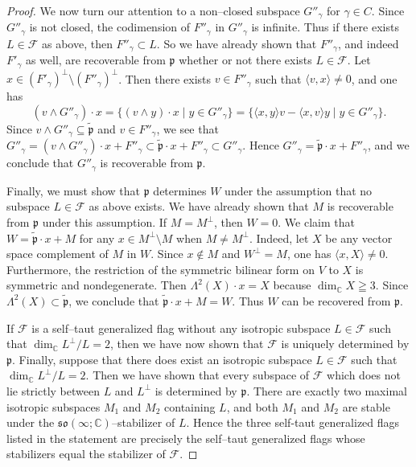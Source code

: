 \documentclass[oneside,leqno,11pt]{article}
\def\gp{\mathfrak{p}}
\def\gso{\mathfrak{so}}
\def\C{\mathbb{C}}
\def\cF{\mathcal{F}}
\begin{document}
\begin{proof}
We now turn our attention to a non--closed subspace $G''_\gamma$ for $\gamma \in C$.  Since $G''_\gamma$ is not closed, the codimension of $F''_\gamma$ in $G''_\gamma$ is infinite.  Thus if there exists $L \in \cF$ as above, then $F''_\gamma \subset L$.  So we have already shown that $F''_\gamma$,  and indeed $F'_\gamma$ as well, are recoverable from $\gp$ whether or not there exists $L \in \cF$.  Let $x \in (F'_\gamma)^\perp \setminus (F''_\gamma)^\perp$.
Then there exists 
$v \in F''_\gamma$ such that $\langle v ,x \rangle \neq 0$, and one has
$$
(v \wedge G''_\gamma) \cdot x  =  \{ (v \wedge y) \cdot x \mid y \in G''_\gamma \} 
 =  \{ \langle x , y \rangle v - \langle x , v \rangle y \mid y \in G''_\gamma \}.
$$
Since $v \wedge G''_\gamma \subseteq \widetilde{\gp} $ and $v \in F''_\gamma$, we see that 
$G''_\gamma = (v \wedge G''_\gamma) \cdot x + F''_\gamma \subset 
\widetilde{\gp}  \cdot x + F''_\gamma \subset G''_\gamma$.  Hence 
$G''_\gamma =  \widetilde{\gp}  \cdot x + F''_\gamma$, and we conclude that $G''_\gamma$ is recoverable from $\gp$.

Finally, we must show that $\gp$ determines $W$ under the assumption that no subspace $L \in \cF$ as above exists.  We have already shown that $M$ is recoverable from $\gp$ under this assumption.
If $M = M^\bot$, then $W = 0$.   We claim that $W = \widetilde{\gp} \cdot x + M$ for any $x \in M^\perp \setminus M$ when $M \neq M^\bot$.
Indeed, let $X$ be any vector space complement of $M$ in $W$. 
Since $x \notin M$ and $W^\perp = M$, one has $\langle x , X \rangle \neq 0$.  
Furthermore, the restriction of the symmetric bilinear form on $V$ to $X$ is symmetric and nondegenerate. 
Then $\Lambda^2 (X) \cdot x = X$ because $\dim_\C X \geqq 3$.
Since $\Lambda^2(X) \subset \widetilde{\gp}$, we conclude that $\widetilde{\gp}  \cdot x + M = W$.  
Thus $W$ can be recovered from $\gp$.

If $\cF$ is a self--taut generalized flag without any isotropic subspace $L \in \cF$ such that $\dim_\C L^\perp / L = 2$, then we have now shown that $\cF$ is uniquely determined by $\gp$.  Finally, suppose that there does exist an isotropic subspace $L \in \cF$ such that $\dim_\C L^\perp / L = 2$.  Then we have shown that every subspace of $\cF$ which does not lie strictly between $L$ and $L^\perp$ is determined by $\gp$.  There are exactly two maximal isotropic subspaces $M_1$ and $M_2$ containing $L$, and both $M_1$ and $M_2$ are stable under the $\gso(\infty;\C)$--stabilizer of $L$.  Hence the three self-taut generalized flags listed in the statement are precisely the self--taut generalized flags whose stabilizers equal the stabilizer of $\cF$.
\end{proof}
\end{document}
